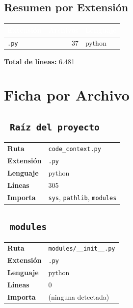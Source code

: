 \documentclass[12pt, a4paper]{report}
\begin{document}
\section{Resumen por Extensión}

\begin{center}
\begin{tabular}{lrl}
  \toprule
  \rowcolor{tablehead}\textcolor{white}{\textbf{Extensión}} & \textcolor{white}{\textbf{Archivos}} & \textcolor{white}{\textbf{Lenguaje}} \\
  \midrule
  \texttt{.py} & 37 & python \\
  \bottomrule
\end{tabular}
\end{center}

\medskip
\textbf{Total de líneas:} 6.481

\chapter{Ficha por Archivo}

\section{\ \texttt{Raíz del proyecto}}

\begin{fichabox}
\small
\begin{tabular}{@{}ll@{}}
  \textbf{Ruta} & \texttt{code\_context.py} \\
  \textbf{Extensión} & \texttt{.py} \\
  \textbf{Lenguaje} & python \\
  \textbf{Líneas} & 305 \\
  \textbf{Importa} & \parbox[t]{10cm}{\texttt{sys}, \texttt{pathlib}, \texttt{modules}} \\
\end{tabular}
\end{fichabox}

\medskip

\section{\ \texttt{modules}}

\begin{fichabox}
\small
\begin{tabular}{@{}ll@{}}
  \textbf{Ruta} & \texttt{modules/\_\_init\_\_.py} \\
  \textbf{Extensión} & \texttt{.py} \\
  \textbf{Lenguaje} & python \\
  \textbf{Líneas} & 0 \\
  \textbf{Importa} & \textcolor{muted}{(ninguna detectada)} \\
\end{tabular}
\end{fichabox}
\end{document}
